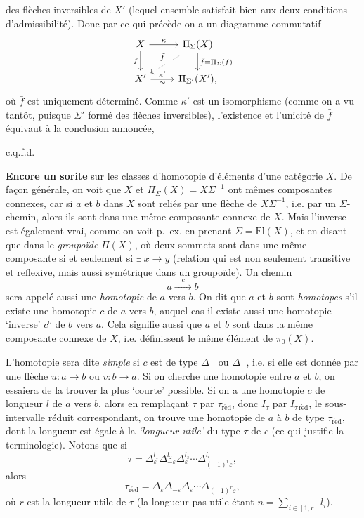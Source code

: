 \documentclass[11pt]{article}
\newcommand{\printedpage}[1]{\marginpar{\footnotesize p.~#1}}
\newcommand{\msp}[1]{\marginpar{\vspace*{10pt}\footnotesize [#1]}}
\newcommand{\red}{\mathrm{r\acute{e}d}}
\begin{document}
\setcounter{footnote}{20}

\printedpage{49}
\msp{page 74}
des flèches inversibles de $X'$ (lequel ensemble satisfait bien aux deux conditions d'admissibilité). Donc par ce qui précède on a un diagramme commutatif
\[
\begin{tikzcd}
X \ar[r,"\kappa"] \ar[d,"f"'] & \Pi_{\Sigma}(X) \ar[d,"\bar f = \Pi_{\Sigma}(f)"] \ar[dl,dotted,"\tilde f"'] \\
X' \ar[r,"\kappa'","\sim"'] & \Pi_{\Sigma'}(X'),
\end{tikzcd}
\]
où $\bar f$ est uniquement déterminé. Comme $\kappa'$ est un isomorphisme (comme on a vu tantôt, puisque $\Sigma'$ formé des flèches inversibles), l'existence et l'unicité de $\bar f$ équivaut à la conclusion annoncée,

\hfill c.q.f.d.

\textbf{Encore un sorite} sur les classes d'homotopie d'éléments d'une catégorie $X$. De façon générale, on voit que $X$ et $\Pi_{\Sigma}(X) = X\Sigma^{-1}$ ont mêmes composantes connexes, car si
\msp{page 75}
$a$ et $b$ dans $X$ sont reliés par une flèche de $X\Sigma^{-1}$, i.e. par un $\Sigma$-chemin, alors ils sont dans une même composante connexe de $X$. Mais l'inverse est également vrai, comme on voit p.~ex. en prenant $\Sigma = \mathrm{Fl}(X)$, et en disant que dans le \textit{groupoïde} $\Pi(X)$, où deux sommets sont dans une même composante si et seulement si $\exists\ x \longrightarrow y$ (relation qui est non seulement transitive et reflexive, mais aussi symétrique dans un groupoïde). Un chemin
\[
a \xrightarrow{\quad c \quad} b
\]
sera appelé aussi une \textit{homotopie} de $a$ vers $b$. On dit que $a$ et $b$ sont \textit{homotopes} s'il existe une homotopie $c$ de $a$ vers $b$, auquel cas il existe aussi une homotopie `inverse' $c^{o}$ de $b$ vers $a$. Cela signifie aussi que $a$ et $b$ sont dans la même composante connexe de $X$, i.e. définissent le même élément de $\pi_0(X)$.

L'homotopie sera dite \textit{simple} si $c$ est de type $\Delta_{+}$ ou $\Delta_{-}$, i.e. si elle est donnée par une flèche $u : a \longrightarrow b$ ou $v : b \longrightarrow a$. Si on cherche une homotopie entre $a$ et $b$, on essaiera de la trouver la plus `courte' possible. Si on a une homotopie $c$ de longueur $l$ de $a$ vers $b$, alors en remplaçant $\tau$ par $\tau_{\red}$, donc $I_{\tau}$ par $I_{\tau\,\red}$, le sous-intervalle réduit
\msp{page 76}
correspondant, on trouve une homotopie de $a$ à $b$ de type $\tau_{\red}$, dont la longueur est égale à la \textit{`longueur utile'} du type $\tau$ de $c$ (ce qui justifie la terminologie). Notons que si
\[
\tau = \Delta_{\varepsilon}^{l_1}\Delta_{-\varepsilon}^{l_2}\Delta_{\varepsilon}^{l_3}\cdots\Delta_{(-1)^{r}\varepsilon}^{l_r},
\]
alors
\[
\tau_{\red} = \Delta_{\varepsilon}\Delta_{-\varepsilon}\Delta_{\varepsilon}\cdots\Delta_{(-1)^{r}\varepsilon},
\]
\printedpage{50}
 où $r$ est la longueur utile de $\tau$ (la longueur pas utile étant $n = \sum\limits_{i\in[1,r]} l_i$).
\end{document}
